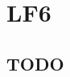 \chapter{\Huge{LF6}}\label{ch:lf6}
\section{TODO}\label{sec:lf6_first_Section}
\setcounter{section}{0}